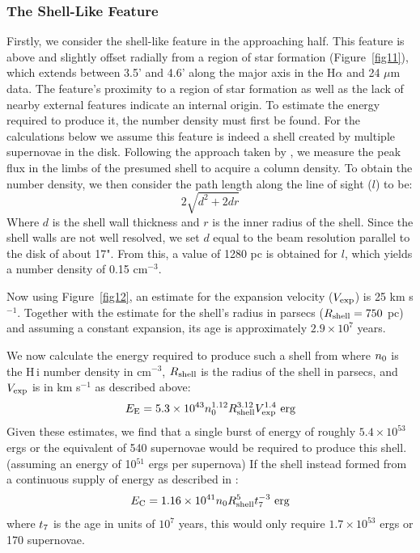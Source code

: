\documentclass{emulateapj}
\begin{document}
\subsubsection{The Shell-Like Feature}\label{Section6.4.1}
\par
     Firstly, we consider the shell-like feature in the approaching half.  This feature is above and slightly offset radially from a region of star formation (Figure~\ref{fig11}), which extends between 3.5' and 4.6' along the major axis in the H$\alpha$ and 24 $\mu$m data.  The feature's proximity to a region of star formation as well as the lack of nearby external features indicate an internal origin.  To estimate the energy required to produce it, the number density must first be found.  For the calculations below we assume this feature is indeed a shell created by multiple supernovae in the disk. Following the approach taken by \citet{1993AJ....105.2098R}, we measure the peak flux in the limbs of the presumed shell to acquire a column density.  To obtain the number density, we then consider the path length along the line of sight ($l$) to be:
\begin{equation}
2\sqrt{d^{2}+2dr}
\end{equation}
Where $d$ is the shell wall thickness and $r$ is the inner radius of the shell.  Since the shell walls are not well resolved, we set $d$ equal to the beam resolution parallel to the disk of about 17".  From this, a value of 1280 pc is obtained for $l$, which yields a number density of 0.15 cm$^{-3}$. 

\par
     Now using Figure~\ref{fig12}, an estimate for the expansion velocity ($V_{\rm exp}$) is 25 km s$^{-1}$.  Together with the estimate for the shell's radius in parsecs ($R_{\rm shell}=750$ pc) and assuming a constant expansion, its age is approximately $2.9\times10^{7}$ years. 

\par
    We now calculate the energy required to produce such a shell from \citet{1974ApJ...188..501C} where $n_{\rm 0}$ is the {\sc H\,i} number density in cm$^{-3}$, $R_{\rm shell}$ is the radius of the shell in parsecs, and $V_{\rm exp}$ is in km s$^{-1}$ as described above:   
\begin{equation}
E_{\rm E}=5.3\times10^{43}n_{\rm 0}^{1.12}R_{\rm shell}^{3.12}V_{\rm exp}^{1.4} \textrm{ erg}
\end{equation}
 Given these estimates, we find that a single burst of energy of roughly $5.4\times10^{53}$ ergs or the equivalent of 540 supernovae would be required to produce this shell. (assuming an energy of 10$^{51}$ ergs per supernova) If the shell instead formed from a continuous supply of energy as described in \citet{1987ApJ...317..190M}:
\begin{equation}
E_{\rm C}=1.16\times10^{41}n_{\rm 0}R_{\rm shell}^{5}t_{\rm 7}^{-3} \textrm{ erg}
\end{equation}
 where $t_{\rm 7}$ is the age in units of $10^7$ years, this would only require $1.7\times10^{53}$ ergs or 170 supernovae. 
\end{document}
